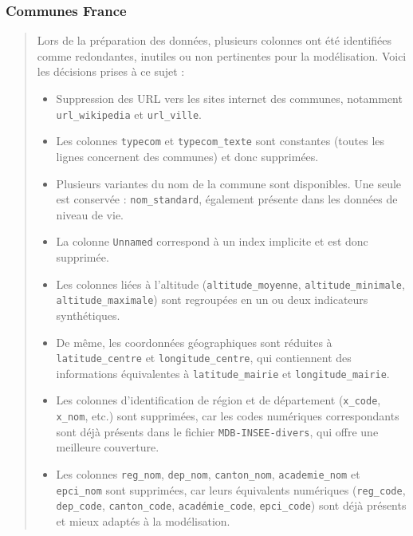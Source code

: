 \subsubsection{Communes France}
\begin{quote}
\noindent

Lors de la préparation des données, plusieurs colonnes ont été identifiées comme redondantes, inutiles ou non pertinentes pour la modélisation. Voici les décisions prises à ce sujet :

\begin{itemize}
    \item Suppression des URL vers les sites internet des communes, notamment \texttt{url\_wikipedia} et \texttt{url\_ville}.
    
    \item Les colonnes \texttt{typecom} et \texttt{typecom\_texte} sont constantes (toutes les lignes concernent des communes) et donc supprimées.
    
    \item Plusieurs variantes du nom de la commune sont disponibles. Une seule est conservée : \texttt{nom\_standard}, également présente dans les données de niveau de vie.
    
    \item La colonne \texttt{Unnamed} correspond à un index implicite et est donc supprimée.
    
    \item Les colonnes liées à l’altitude (\texttt{altitude\_moyenne}, \texttt{altitude\_minimale}, \texttt{altitude\_maximale}) sont regroupées en un ou deux indicateurs synthétiques.
    
    \item De même, les coordonnées géographiques sont réduites à \texttt{latitude\_centre} et \texttt{longitude\_centre}, qui contiennent des informations équivalentes à \texttt{latitude\_mairie} et \texttt{longitude\_mairie}.
    
    \item Les colonnes d’identification de région et de département (\texttt{x\_code}, \texttt{x\_nom}, etc.) sont supprimées, car les codes numériques correspondants sont déjà présents dans le fichier \texttt{MDB-INSEE-divers}, qui offre une meilleure couverture.
    
    \item Les colonnes \texttt{reg\_nom}, \texttt{dep\_nom}, \texttt{canton\_nom}, \texttt{academie\_nom} et \texttt{epci\_nom} sont supprimées, car leurs équivalents numériques (\texttt{reg\_code}, \texttt{dep\_code}, \texttt{canton\_code}, \texttt{académie\_code}, \texttt{epci\_code}) sont déjà présents et mieux adaptés à la modélisation.
    \end{itemize}

\end{quote}

